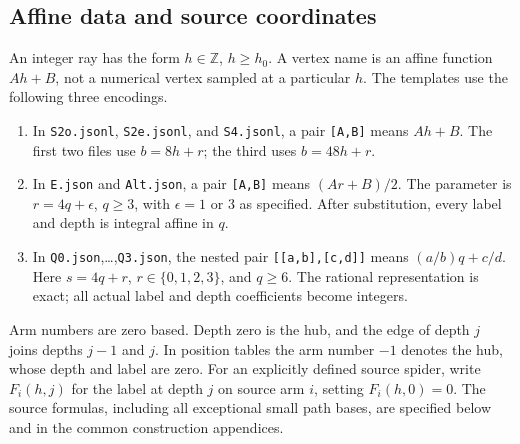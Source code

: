 \subsection{Affine data and source coordinates}
\label{templates:encoding}

An integer ray has the form $h\in\mathbb Z$, $h\ge h_0$.  A vertex
name is an affine function $Ah+B$, not a numerical vertex sampled at
a particular $h$.  The templates use the following three encodings.
\begin{enumerate}
\item In \texttt{S2o.jsonl}, \texttt{S2e.jsonl}, and
\texttt{S4.jsonl}, a pair \texttt{[A,B]} means $Ah+B$.
The first two files use $b=8h+r$; the third uses $b=48h+r$.
\item In \texttt{E.json} and \texttt{Alt.json}, a pair
\texttt{[A,B]} means $(Ar+B)/2$.  The parameter is
$r=4q+\epsilon$, $q\ge3$, with $\epsilon=1$ or $3$ as specified.
After substitution, every label and depth is integral affine in $q$.
\item In \texttt{Q0.json},\ldots,\texttt{Q3.json}, the nested pair
\texttt{[[a,b],[c,d]]} means $(a/b)q+c/d$.  Here $s=4q+r$,
$r\in\{0,1,2,3\}$, and $q\ge6$.  The rational representation is
exact; all actual label and depth coefficients become integers.
\end{enumerate}

Arm numbers are zero based.  Depth zero is the hub, and the edge of
depth $j$ joins depths $j-1$ and $j$.  In position tables the arm
number $-1$ denotes the hub, whose depth and label are zero.
For an explicitly defined source spider, write
$F_i(h,j)$ for the label at depth $j$ on source arm $i$, setting
$F_i(h,0)=0$.  The source formulas, including all exceptional small
path bases, are specified below and in the common construction
appendices.

